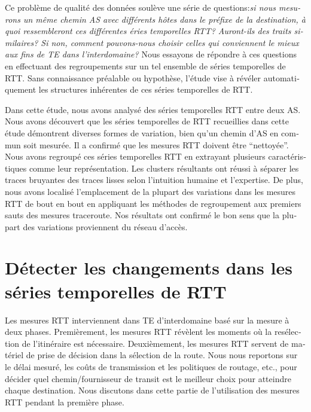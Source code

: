 \begin{otherlanguage}{french}
Ce problème de qualité des données soulève une série de questions:\textit{si nous mesurons un même chemin AS avec différents hôtes dans le préfixe de la destination, 
à quoi ressembleront ces différentes éries temporelles RTT? 
Auront-ils des traits similaires? 
Si non, comment pouvons-nous choisir celles qui conviennent le mieux aux fins de TE dans l'interdomaine?}
Nous essayons de répondre à ces questions en effectuant des regroupements sur un tel ensemble de séries temporelles de RTT.
Sans connaissance préalable ou hypothèse, l'étude vise à révéler automatiquement les structures inhérentes de ces séries temporelles de RTT.

Dans cette étude, nous avons analysé des séries temporelles RTT entre deux AS.
Nous avons découvert que les séries temporelles de RTT recueillies dans cette étude démontrent diverses formes de variation, 
bien qu'un chemin d'AS en commun soit mesurée.
Il a confirmé que les mesures RTT doivent être ``nettoyée''.
Nous avons regroupé ces séries temporelles RTT en extrayant
plusieurs caractéristiques comme leur représentation.
Les clusters résultants ont réussi à séparer les traces bruyantes des traces lisses selon l'intuition humaine et l'expertise.
De plus, nous avons localisé l'emplacement de la plupart des variations dans les mesures RTT de bout en bout en appliquant les méthodes de regroupement aux premiers sauts des mesures traceroute.
Nos résultats ont confirmé le bon sens que la plupart des variations proviennent du réseau d'accès.


\section*{Détecter les changements dans les séries temporelles de RTT}

Les mesures RTT interviennent dans TE d'interdomaine basé sur la mesure à deux phases.
Premièrement, les mesures RTT révèlent les moments où la resélection de l'itinéraire est nécessaire. %
Deuxièmement, les mesures RTT servent de matériel de prise de décision dans la sélection de la route. 
Nous nous reportons sur le délai mesuré, les coûts de transmission et les politiques de routage, etc., 
pour décider quel chemin/fournisseur de transit est le meilleur choix pour atteindre chaque destination.
Nous discutons dans cette partie de l'utilisation des mesures RTT pendant la première phase.


\end{otherlanguage}
